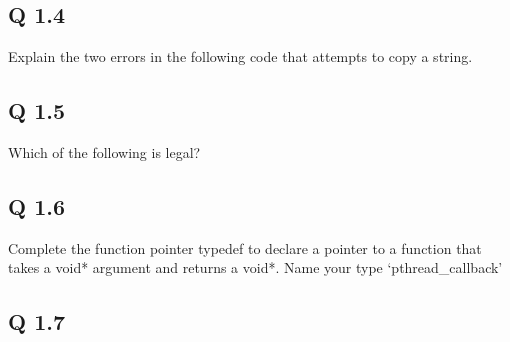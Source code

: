\subsection{Q 1.4}\label{q-1.4-1}

Explain the two errors in the following code that attempts to copy a
string.

\begin{Shaded}
\begin{Highlighting}[]
  \NormalTok{result[}\NormalTok{(src)]; }
  
\NormalTok{\}}
\end{Highlighting}
\end{Shaded}

\subsection{Q 1.5}\label{q-1.5}

Which of the following is legal?

\begin{Shaded}
\begin{Highlighting}[]
 \NormalTok{);}
 
\NormalTok{);}
\end{Highlighting}
\end{Shaded}

\subsection{Q 1.6}\label{q-1.6}

Complete the function pointer typedef to declare a pointer to a function
that takes a void* argument and returns a void*. Name your type
`pthread\_callback'

\begin{Shaded}
\begin{Highlighting}[]
 \NormalTok{______________________;}
\end{Highlighting}
\end{Shaded}

\subsection{Q 1.7}\label{q-1.7}

